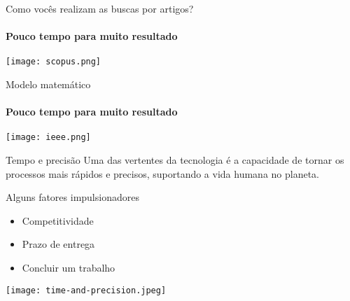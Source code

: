 \begin{frame}[c]{Como vocês realizam as buscas por artigos?} 
    \framesubtitle{Pouco tempo para muito resultado}
    \transdissolve[duration=0.5]
   
    \centering
    \texttt{[image: scopus.png]}
\end{frame}
\begin{frame}[c]{Modelo matemático} 
    \framesubtitle{Pouco tempo para muito resultado}
    \transdissolve[duration=0.5]
   
    \centering
    \texttt{[image: ieee.png]}
\end{frame}
\begin{frame}[t]{Tempo e precisão}
    \transboxout[duration=0.5]
    Uma das vertentes da tecnologia é a capacidade de tornar os processos mais rápidos e precisos, suportando a vida humana no planeta.

    \vspace*{0.2cm}
    Alguns fatores impulsionadores
		\begin{itemize}
			\item Competitividade
			\item Prazo de entrega
			\item Concluir um trabalho 
		\end{itemize}

    \vspace*{0.2cm}
    \texttt{[image: time-and-precision.jpeg]}

    \begin{columns}
    \end{columns}
\end{frame}
